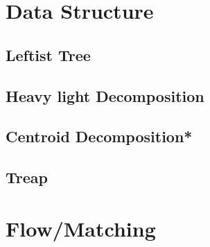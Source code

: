 \section{Data Structure}
\subsection{Leftist Tree}

\subsection{Heavy light Decomposition}

\subsection{Centroid Decomposition*} %

% 
% 
%
%
\subsection{Treap}



\section{Flow/Matching}
% 
